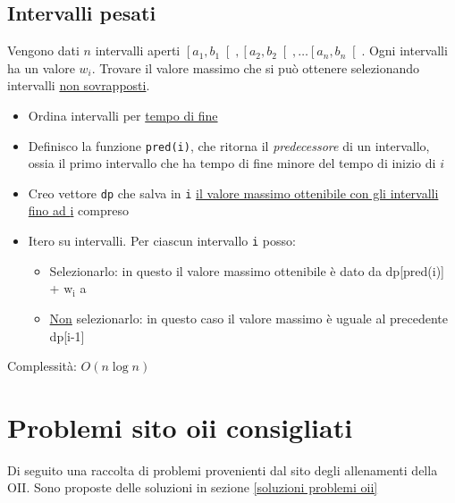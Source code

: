 \subsection{Intervalli pesati}\label{intervalli pesati}
Vengono dati $ n $ intervalli aperti $ \left[a_1, b_1\right[, \left[a_2, b_2\right[ , \ldots  \left[a_n, b_n\right[ $. Ogni intervalli ha un valore $ w_i $. Trovare il valore massimo che si può ottenere selezionando intervalli \underline{non sovrapposti}.

\vskip3mm\vskip3mm
\begin{itemize}
	\item Ordina intervalli per \underline{tempo di fine}
	\item Definisco la funzione \verb|pred(i)|, che ritorna il \textit{predecessore} di un intervallo, ossia il primo intervallo che ha tempo di fine minore del tempo di inizio di $ i $
	\item Creo vettore \verb|dp| che salva in \verb|i| \underline{il valore massimo ottenibile con gli intervalli fino ad {\ttfamily i}} compreso
	\item Itero su intervalli. Per ciascun intervallo \verb|i| posso:
	      \begin{itemize}
		      \item Selezionarlo: in questo il valore massimo ottenibile è dato da {\ttfamily dp[pred(i)] + $ \text{w}_{\text{i}} $} a
		      \item \underline{Non} selezionarlo: in questo caso il valore massimo è uguale al precedente {\ttfamily dp[i-1]}
	      \end{itemize}
\end{itemize}
Complessità: $ O\left(n \log n\right) $

\section{Problemi sito oii consigliati}\label{problemi oii}
Di seguito una raccolta di problemi provenienti dal sito degli allenamenti della OII. Sono proposte delle soluzioni in sezione \cref{soluzioni problemi oii}


